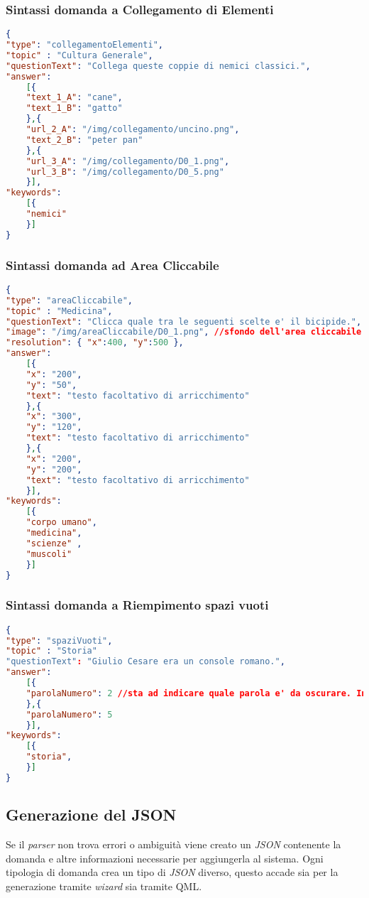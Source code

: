 \subsubsection{Sintassi domanda a Collegamento di Elementi}
\begin{lstlisting}[language=json,firstnumber=1]
{
"type": "collegamentoElementi",
"topic" : "Cultura Generale",
"questionText": "Collega queste coppie di nemici classici.",
"answer":
	[{
	"text_1_A": "cane",
	"text_1_B": "gatto"
	},{
	"url_2_A": "/img/collegamento/uncino.png",
	"text_2_B": "peter pan"
	},{
	"url_3_A": "/img/collegamento/D0_1.png",
	"url_3_B": "/img/collegamento/D0_5.png"
	}],
"keywords":
	[{
	"nemici"
	}]
}
\end{lstlisting}

\subsubsection{Sintassi domanda ad Area Cliccabile}
\begin{lstlisting}[language=json,firstnumber=1]
{
"type": "areaCliccabile",
"topic" : "Medicina",
"questionText": "Clicca quale tra le seguenti scelte e' il bicipide.",
"image": "/img/areaCliccabile/D0_1.png", //sfondo dell'area cliccabile
"resolution": { "x":400, "y":500 },
"answer":
	[{
	"x": "200",
	"y": "50",
	"text": "testo facoltativo di arricchimento"
	},{
	"x": "300",
	"y": "120",
	"text": "testo facoltativo di arricchimento"
	},{
	"x": "200",
	"y": "200",
	"text": "testo facoltativo di arricchimento"
	}],
"keywords":
	[{
	"corpo umano",
	"medicina",
	"scienze" ,
	"muscoli"
	}]
}
\end{lstlisting}

\subsubsection{Sintassi domanda a Riempimento spazi vuoti}
\begin{lstlisting}[language=json,firstnumber=1]
{
"type": "spaziVuoti",
"topic" : "Storia"
"questionText": "Giulio Cesare era un console romano.",
"answer":
	[{
	"parolaNumero": 2 //sta ad indicare quale parola e' da oscurare. In questo caso la numero 2
	},{
	"parolaNumero": 5
	}],
"keywords":
	[{
	"storia",
	}] 
}
\end{lstlisting}

\subsection{Generazione del JSON}
Se il \textit{parser} non trova errori o ambiguità viene creato un \textit{JSON} contenente la domanda e altre informazioni necessarie per aggiungerla al sistema. Ogni tipologia di domanda crea un tipo di \textit{JSON} diverso, questo accade sia per la generazione tramite \textit{wizard} sia tramite QML.

